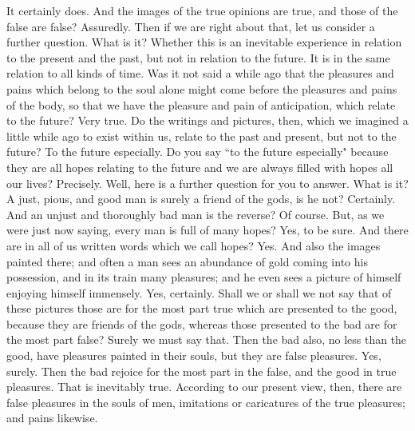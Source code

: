\documentclass[letterpaper,12pt]{article}
\newcommand{\stephpag}[1]{\marginnote{\small\itshape\fontfamily{ppl}\selectfont #1}}
\begin{document}
\begin{drama}
It certainly does.
\socratesspeaks
And the images of the true opinions are true, and those of the false are false?
\protarchusspeaks
Assuredly.
\socratesspeaks
Then if we are right about that, let us consider a further question.
\protarchusspeaks
What is it?
\socratesspeaks
Whether this is an inevitable experience in relation to the present and the past, but not in relation to the future.
\protarchusspeaks
It is in the same relation to all kinds of time. \stephpag{d}
\socratesspeaks
Was it not said a while ago that the pleasures and pains which belong to the soul alone might come before the pleasures and pains of the body, so that we have the pleasure and pain of anticipation, which relate to the future?
\protarchusspeaks
Very true.
\socratesspeaks
Do the writings and pictures, then, which we imagined a little while ago to exist within us, relate to the past and present, \stephpag{e} but not to the future?
\protarchusspeaks
To the future especially.
\socratesspeaks
Do you say ``to the future especially" because they are all hopes relating to the future and we are always filled with hopes all our lives?
\protarchusspeaks
Precisely.
\socratesspeaks
Well, here is a further question for you to answer.
\protarchusspeaks
What is it?
\socratesspeaks
A just, pious, and good man is surely a friend of the gods, is he not?
\protarchusspeaks
Certainly.
\socratesspeaks
And an unjust and thoroughly bad man \stephpag{40 a} is the reverse?
\protarchusspeaks
Of course.
\socratesspeaks
But, as we were just now saying, every man is full of many hopes?
\protarchusspeaks
Yes, to be sure.
\socratesspeaks
And there are in all of us written words which we call hopes?
\protarchusspeaks
Yes.
\socratesspeaks
And also the images painted there; and often a man sees an abundance of gold coming into his possession, and in its train many pleasures; and he even sees a picture of himself enjoying himself immensely. \stephpag{b}
\protarchusspeaks
Yes, certainly.
\socratesspeaks
Shall we or shall we not say that of these pictures those are for the most part true which are presented to the good, because they are friends of the gods, whereas those presented to the bad are for the most part false?
\protarchusspeaks
Surely we must say that.
\socratesspeaks
Then the bad also, no less than the good, have pleasures painted in their souls, but they are false pleasures.
\protarchusspeaks
Yes, surely. \stephpag{c}
\socratesspeaks
Then the bad rejoice for the most part in the false, and the good in true pleasures.
\protarchusspeaks
That is inevitably true.
\socratesspeaks
According to our present view, then, there are false pleasures in the souls of men, imitations or caricatures of the true pleasures; and pains likewise.

\end{drama}
\end{document}
